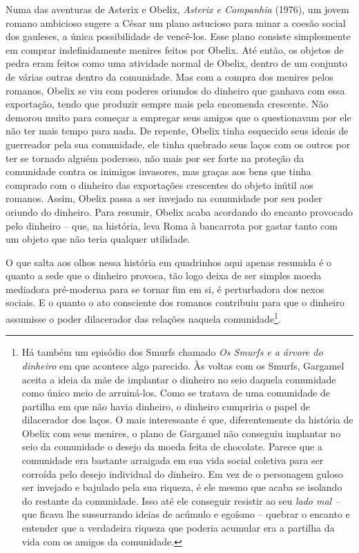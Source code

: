 Numa das aventuras de Asterix e Obelix, \emph{Asterix e Companhia}
(1976), um jovem romano ambicioso sugere a César um plano astucioso para
minar a coesão social dos gauleses, a única possibilidade de vencê-los.
Esse plano consiste simplesmente em comprar indefinidamente menires
feitos por Obelix. Até então, os objetos de pedra eram feitos como uma
atividade normal de Obelix, dentro de um conjunto de várias outras
dentro da comunidade. Mas com a compra dos menires pelos romanos, Obelix
se viu com poderes oriundos do dinheiro que ganhava com essa exportação,
tendo que produzir sempre mais pela encomenda crescente. Não demorou
muito para começar a empregar seus amigos que o questionavam por ele não
ter mais tempo para nada. De repente, Obelix tinha esquecido seus ideais
de guerreador pela sua comunidade, ele tinha quebrado seus laços com os
outros por ter se tornado alguém poderoso, não mais por ser forte na
proteção da comunidade contra os inimigos invasores, mas graças aos bens
que tinha comprado com o dinheiro das exportações crescentes do objeto
inútil aos romanos. Assim, Obelix passa a ser invejado na comunidade por
seu poder oriundo do dinheiro. Para resumir, Obelix acaba acordando do
encanto provocado pelo dinheiro -- que, na história, leva Roma à
bancarrota por gastar tanto com um objeto que não teria qualquer
utilidade.

O que salta aos olhos nessa história em quadrinhos aqui apenas resumida
é o quanto a sede que o dinheiro provoca, tão logo deixa de ser simples
moeda mediadora pré-moderna para se tornar fim em si, é perturbadora dos
nexos sociais. E o quanto o ato consciente dos romanos contribuiu para
que o dinheiro assumisse o poder dilacerador das relações naquela
comunidade\footnote{Há também um episódio dos Smurfs chamado \emph{Os
  Smurfs e a árvore do dinheiro} em que acontece algo parecido. Às
  voltas com os Smurfs, Gargamel aceita a ideia da mãe de implantar o
  dinheiro no seio daquela comunidade como único meio de arruiná-los.
  Como se tratava de uma comunidade de partilha em que não havia
  dinheiro, o dinheiro cumpriria o papel de dilacerador dos laços. O
  mais interessante é que, diferentemente da história de Obelix com seus
  menires, o plano de Gargamel não conseguiu implantar no seio da
  comunidade o desejo da moeda feita de chocolate. Parece que a
  comunidade era bastante arraigada em sua vida social coletiva para ser
  corroída pelo desejo individual do dinheiro. Em vez de o personagem
  guloso ser invejado e bajulado pela sua riqueza, é ele mesmo que acaba
  se isolando do restante da comunidade. Isso até ele conseguir resistir
  ao seu \emph{lado mal --} que ficava lhe sussurrando ideias de acúmulo
  e egoísmo -- quebrar o encanto e entender que a verdadeira riqueza que
  poderia acumular era a partilha da vida com os amigos da comunidade.}.

